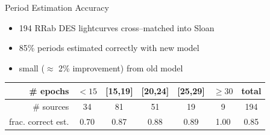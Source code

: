 \documentclass[12pt]{beamer}
\begin{document}
\begin{frame}{Period Estimation Accuracy}
  \begin{itemize}
  \item 194 RRab DES lightcurves cross--matched into Sloan
  \item 85\% periods estimated correctly with new model
  \item small ($\approx$ 2\% improvement) from old model
  \end{itemize}
    \begin{tabular}{ r | c | c | c | c | c | c }
\# epochs & $<15$ & [15,19] & [20,24] & [25,29] & $\geq 30$ & total\\ 
      \hline 
\# sources & 34 & 81 & 51 & 19 & 9 & 194\\ 
      frac. correct est. & 0.70 & 0.87 & 0.88 & 0.89 & 1.00 & 0.85
    \end{tabular}
    
\end{frame}







  
\end{document}
